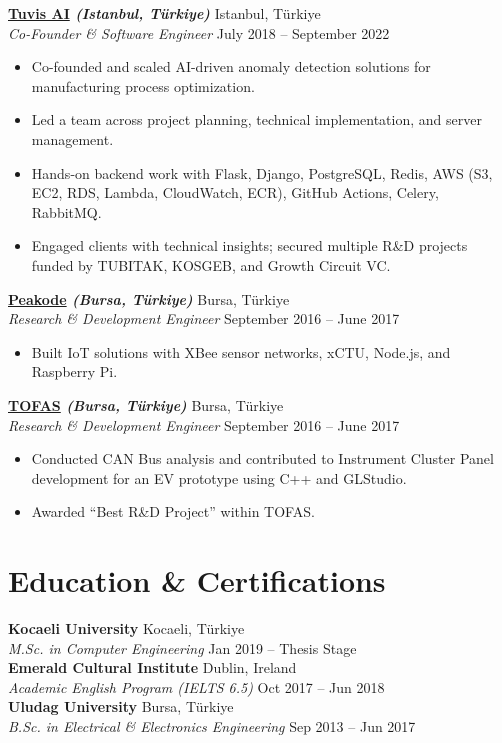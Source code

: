 \documentclass[10pt,a4paper]{extarticle}
\begin{document}
\textbf{\href{https://www.tuvisai.com}{Tuvis AI} \textit{(Istanbul, Türkiye)}} \hfill Istanbul, Türkiye\\
\textit{Co-Founder \& Software Engineer} \hfill July 2018 -- September 2022
\begin{itemize}[leftmargin=*,noitemsep,topsep=0pt]
    \item Co-founded and scaled AI-driven anomaly detection solutions for manufacturing process optimization.
    \item Led a team across project planning, technical implementation, and server management.
    \item Hands-on backend work with Flask, Django, PostgreSQL, Redis, AWS (S3, EC2, RDS, Lambda, CloudWatch, ECR), GitHub Actions, Celery, RabbitMQ.
    \item Engaged clients with technical insights; secured multiple R\&D projects funded by TUBITAK, KOSGEB, and Growth Circuit VC.
\end{itemize}

\textbf{\href{https://www.peakode.com}{Peakode} \textit{(Bursa, Türkiye)}} \hfill Bursa, Türkiye\\
\textit{Research \& Development Engineer} \hfill September 2016 -- June 2017
\begin{itemize}[leftmargin=*,noitemsep,topsep=0pt]
    \item Built IoT solutions with XBee sensor networks, xCTU, Node.js, and Raspberry Pi.
\end{itemize}

\textbf{\href{https://www.tofas.com.tr}{TOFAS} \textit{(Bursa, Türkiye)}} \hfill Bursa, Türkiye\\
\textit{Research \& Development Engineer} \hfill September 2016 -- June 2017
\begin{itemize}[leftmargin=*,noitemsep,topsep=0pt]
    \item Conducted CAN Bus analysis and contributed to Instrument Cluster Panel development for an EV prototype using C++ and GLStudio.
    \item Awarded ``Best R\&D Project'' within TOFAS.
\end{itemize}


\section{Education \& Certifications}
\textbf{Kocaeli University} \hfill Kocaeli, Türkiye\\
\textit{M.Sc. in Computer Engineering} \hfill Jan 2019 -- Thesis Stage\\[4pt]
\textbf{Emerald Cultural Institute} \hfill Dublin, Ireland\\
\textit{Academic English Program (IELTS 6.5)} \hfill Oct 2017 -- Jun 2018\\[4pt]
\textbf{Uludag University} \hfill Bursa, Türkiye\\
\textit{B.Sc. in Electrical \& Electronics Engineering} \hfill Sep 2013 -- Jun 2017\\[6pt]
\end{document}
